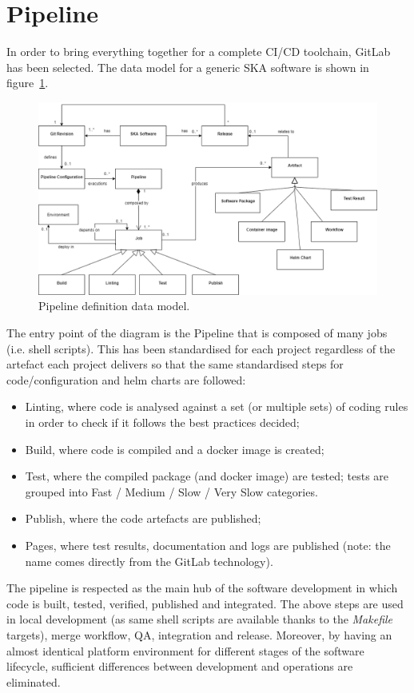 \documentclass[a4paper]{spie}  %
\begin{document}
\section{Pipeline} \label{pipeline}

In order to bring everything together for a complete CI/CD toolchain, GitLab~\cite{gitlab} has been selected. The data model for a generic SKA software is shown in figure~\ref{fig:pipelinedatamodel}.

\begin{figure}[!htb]
   \centering
   \includegraphics*[width=0.8\columnwidth]{dataEntity}
   \caption{Pipeline definition data model.}
   \label{fig:pipelinedatamodel}
\end{figure}

The entry point of the diagram is the Pipeline that is composed of many jobs (i.e. shell scripts).  This has been standardised for each project regardless of the artefact each project delivers so that the same standardised steps for code/configuration and helm charts are followed:
\begin{itemize}
    \item Linting, where code is analysed against a set (or multiple sets) of coding rules in order to check if it follows the best practices decided;
    \item Build, where code is compiled and a docker image is created;
    \item Test, where the compiled package (and docker image) are tested; tests are grouped into Fast / Medium / Slow / Very Slow categories.
    \item Publish, where the code artefacts are published;
    \item Pages, where test results, documentation and logs are published (note: the name comes directly from the GitLab technology).
\end{itemize}

The pipeline is respected as the main hub of the software development in which code is built, tested, verified, published and integrated. The above steps are used in local development (as same shell scripts are available thanks to the \textit{Makefile} targets), merge workflow, QA, integration and release. Moreover, by having an almost identical platform environment for different stages of the software lifecycle, sufficient differences between development and operations are eliminated.
\end{document}
